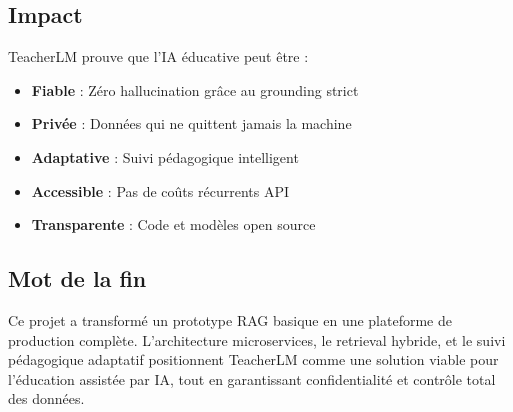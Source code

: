 \documentclass[12pt,a4paper]{article}
\begin{document}
\subsection{Impact}

TeacherLM prouve que l'IA éducative peut être :
\begin{itemize}
    \item \textbf{Fiable} : Zéro hallucination grâce au grounding strict
    \item \textbf{Privée} : Données qui ne quittent jamais la machine
    \item \textbf{Adaptative} : Suivi pédagogique intelligent
    \item \textbf{Accessible} : Pas de coûts récurrents API
    \item \textbf{Transparente} : Code et modèles open source
\end{itemize}

\subsection{Mot de la fin}

Ce projet a transformé un prototype RAG basique en une plateforme de production complète. L'architecture microservices, le retrieval hybride, et le suivi pédagogique adaptatif positionnent TeacherLM comme une solution viable pour l'éducation assistée par IA, tout en garantissant confidentialité et contrôle total des données.
\end{document}

